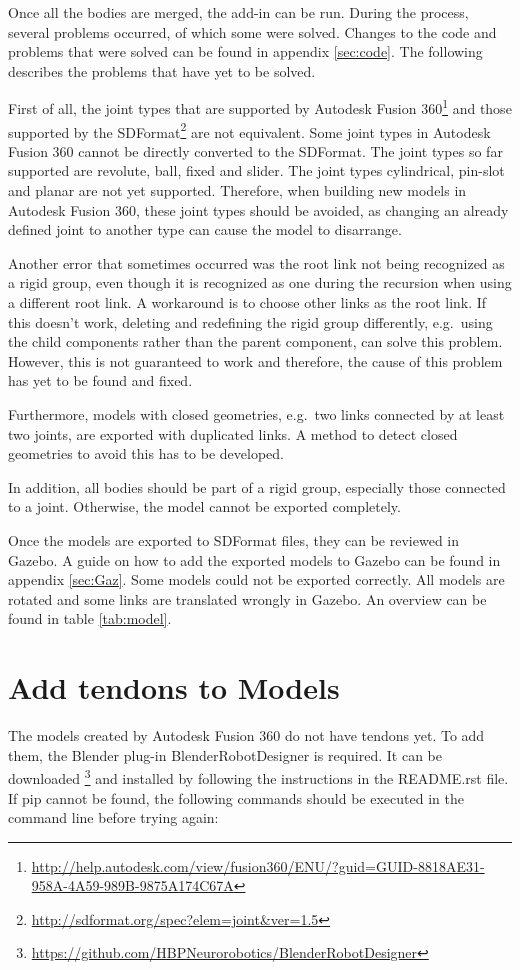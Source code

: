Once all the bodies are merged, the add-in can be run. During the process, several problems occurred, of which some were solved. Changes to the code and problems that were solved can be found in appendix \ref{sec:code}. The following describes the problems that have yet to be solved.

First of all, the joint types that are supported by Autodesk Fusion 360\footnote{\url{http://help.autodesk.com/view/fusion360/ENU/?guid=GUID-8818AE31-958A-4A59-989B-9875A174C67A}} and those supported by the SDFormat\footnote{\url{http://sdformat.org/spec?elem=joint&ver=1.5}} are not equivalent. Some joint types in Autodesk Fusion 360 cannot be directly converted to the SDFormat. The joint types so far supported are revolute, ball, fixed and slider. The joint types cylindrical, pin-slot and planar are not yet supported. Therefore, when building new models in Autodesk Fusion 360, these joint types should be avoided, as changing an already defined joint to another type can cause the model to disarrange.

Another error that sometimes occurred was the root link not being recognized as a rigid group, even though it is recognized as one during the recursion when using a different root link. A workaround is to choose other links as the root link. If this doesn’t work, deleting and redefining the rigid group differently, e.g.\ using the child components rather than the parent component, can solve this problem. However, this is not guaranteed to work and therefore, the cause of this problem has yet to be found and fixed.

Furthermore, models with closed geometries, e.g.\ two links connected by at least two joints, are exported with duplicated links. A method to detect closed geometries to avoid this has to be developed.

In addition, all bodies should be part of a rigid group, especially those connected to a joint. Otherwise, the model cannot be exported completely.

Once the models are exported to SDFormat files, they can be reviewed in Gazebo. A guide on how to add the exported models to Gazebo can be found in appendix \ref{sec:Gaz}. Some models could not be exported correctly. All models are rotated and some links are translated wrongly in Gazebo. An overview can be found in table \ref{tab:model}.


\section{Add tendons to Models}
The models created by Autodesk Fusion 360 do not have tendons yet. To add them, the Blender plug-in BlenderRobotDesigner is required. It can be downloaded \footnote{\url{https://github.com/HBPNeurorobotics/BlenderRobotDesigner}} and installed by following the instructions in the README.rst file. If pip cannot be found, the following commands should be executed in the command line before trying again:

